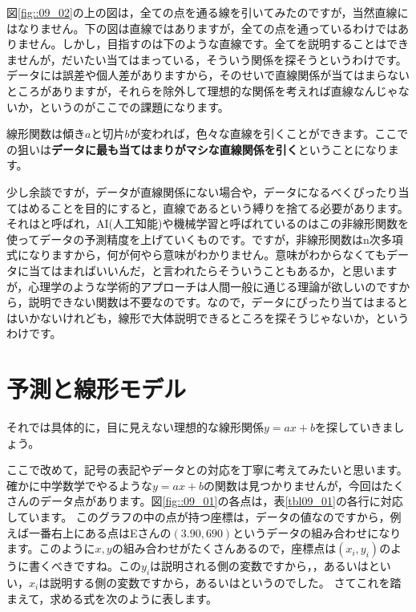 \documentclass{ltjbook}
\begin{document}
図\ref{fig::09_02}の上の図は，全ての点を通る線を引いてみたのですが，当然直線にはなりません。下の図は直線ではありますが，全ての点を通っているわけではありません。しかし，目指すのは下のような直線です。全てを説明することはできませんが，だいたい当てはまっている，そういう関係を探そうというわけです。データには誤差や個人差がありますから，そのせいで直線関係が当てはまらないところがありますが，それらを除外して理想的な関係を考えれば直線なんじゃないか，というのがここでの課題になります。

線形関数は傾き$a$と切片$b$が変われば，色々な直線を引くことができます。ここでの狙いは\textbf{データに最も当てはまりがマシな直線関係を引く}ということになります。

少し余談ですが，データが直線関係にない場合や，データになるべくぴったり当てはめることを目的にすると，直線であるという縛りを捨てる必要があります。それはと呼ばれ，AI(人工知能)や機械学習と呼ばれているのはこの非線形関数を使ってデータの予測精度を上げていくものです。ですが，非線形関数はn次多項式になりますから，何が何やら意味がわかりません。意味がわからなくてもデータに当てはまればいいんだ，と言われたらそういうこともあるか，と思いますが，心理学のような学術的アプローチは人間一般に通じる理論が欲しいのですから，説明できない関数は不要なのです。なので，データにぴったり当てはまるとはいかないけれども，線形で大体説明できるところを探そうじゃないか，というわけです。

\section{予測と線形モデル}

それでは具体的に，目に見えない理想的な線形関係$y=ax+b$を探していきましょう。

ここで改めて，記号の表記やデータとの対応を丁寧に考えてみたいと思います。確かに中学数学でやるような$y=ax+b$の関数は見つかりませんが，今回はたくさんのデータ点があります。図\ref{fig::09_01}の各点は，表\ref{tbl09_01}の各行に対応しています。
このグラフの中の点が持つ座標は，データの値なのですから，例えば一番右上にある点はEさんの$(3.90,690)$というデータの組み合わせになります。このように$x,y$の組み合わせがたくさんあるので，座標点は$(x_i,y_i)$のように書くべきですね。この$y_i$は説明される側の変数ですから，，あるいはといい，$x_i$は説明する側の変数ですから，あるいはというのでした。
さてこれを踏まえて，求める式を次のように表します。
\end{document}
